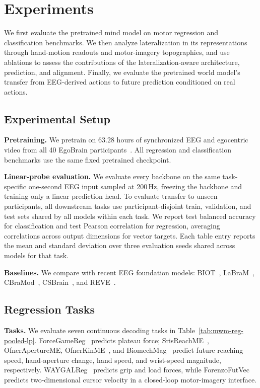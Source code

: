 \section{Experiments}

We first evaluate the pretrained mind model on motor regression and classification benchmarks. We then analyze lateralization in its representations through hand-motion readouts and motor-imagery topographies, and use ablations to assess the contributions of the lateralization-aware architecture, prediction, and alignment. Finally, we evaluate the pretrained world model's transfer from EEG-derived actions to future prediction conditioned on real actions.

\subsection{Experimental Setup}

\noindent\textbf{Pretraining.}
We pretrain \mwm{} on 63.28 hours of synchronized EEG and egocentric video from all 40 EgoBrain participants~\citep{lin2026egobrain}. All regression and classification benchmarks use the same fixed pretrained checkpoint.

\noindent\textbf{Linear-probe evaluation.}
We evaluate every backbone on the same task-specific one-second EEG input sampled at 200\,Hz, freezing the backbone and training only a linear prediction head. To evaluate transfer to unseen participants, all downstream tasks use participant-disjoint train, validation, and test sets shared by all models within each task. We report test balanced accuracy for classification and test Pearson correlation for regression, averaging correlations across output dimensions for vector targets. Each table entry reports the mean and standard deviation over three evaluation seeds shared across models for that task.

\noindent\textbf{Baselines.}
We compare with recent EEG foundation models: BIOT~\citep{yang2023biot}, LaBraM~\citep{jiang2024large}, CBraMod~\citep{wang2025cbramod}, CSBrain~\citep{zhou2025csbrain}, and REVE~\citep{ouahidi2025reve}.

\subsection{Regression Tasks}

\noindent\textbf{Tasks.}
We evaluate seven continuous decoding tasks in Table~\ref{tab:mwm-reg-pooled-lp}. ForceGameReg~\citep{li2026forcegame} predicts plateau force; SrisReachME~\citep{srisrisawang2024simultaneous}, OfnerApertureME, OfnerKinME~\citep{ofner2017upper}, and BiomechMag~\citep{perezblanco2026wrist} predict future reaching speed, hand-aperture change, hand speed, and wrist-speed magnitude, respectively. WAYGALReg~\citep{luciw2014multichannel} predicts grip and load forces, while ForenzoFutVec~\citep{forenzo2024continuous} predicts two-dimensional cursor velocity in a closed-loop motor-imagery interface.

